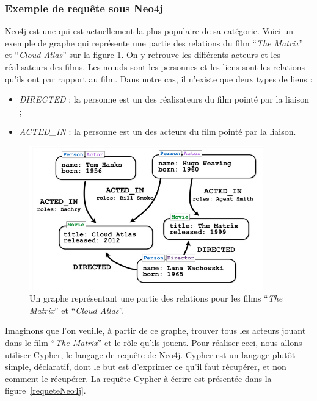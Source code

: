 	\subsubsection{Exemple de requête sous Neo4j}
		Neo4j est une \bddGraphe{} qui est actuellement la plus populaire de sa catégorie. Voici un exemple de graphe qui représente une partie des relations du film \enquote{\textit{The Matrix}} et \enquote{\textit{Cloud Atlas}} sur la figure \ref{grapheNeo4j}. On y retrouve les différents acteurs et les réalisateurs des films. Les nœuds sont les personnes et les liens sont les relations qu'ils ont par rapport au film. Dans notre cas, il n'existe que deux types de liens :
		\vspace{5px}
		\begin{itemize}
			\item \textit{DIRECTED} : la personne est un des réalisateurs du film pointé par la liaison ;
			\item \textit{ACTED\_IN} : la personne est un des acteurs du film pointé par la liaison.
		\end{itemize}

		\begin{figure}[H]
			\centering
			\includegraphics[width=0.9\textwidth]{images/graphe.png}
			\caption{Un graphe représentant une partie des relations pour les films \enquote{\textit{The Matrix}} et \enquote{\textit{Cloud Atlas}}.\cite{grapheNeo4j}}
			\label{grapheNeo4j}
		\end{figure}

		Imaginons que l'on veuille, à partir de ce graphe, trouver tous les acteurs jouant dans le film \enquote{\textit{The Matrix}} et le rôle qu'ils jouent. Pour réaliser ceci, nous allons utiliser Cypher, le langage de requête de Neo4j. Cypher est un langage plutôt simple, déclaratif, dont le but est d'exprimer ce qu'il faut récupérer, et non comment le récupérer. La requête Cypher à écrire est présentée dans la figure~\ref{requeteNeo4j}.

